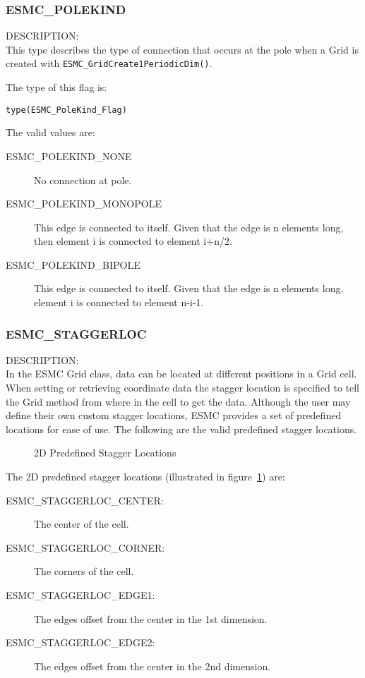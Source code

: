 \subsubsection{ESMC\_POLEKIND}
\label{const:cpolekind}

{\sf DESCRIPTION:\\}
This type describes the type of connection that occurs at the pole when a Grid is 
created with {\tt ESMC\_GridCreate1PeriodicDim()}.

The type of this flag is:

{\tt type(ESMC\_PoleKind\_Flag)}

The valid values are:
\begin{description}
\item [ESMC\_POLEKIND\_NONE] No connection at pole.

\item [ESMC\_POLEKIND\_MONOPOLE] This edge is connected to itself. Given
that the edge is n elements long, then element i is connected to
element i+n/2.

\item [ESMC\_POLEKIND\_BIPOLE] This edge is connected to itself. Given
that the edge is n elements long, element i is connected to element n-i-1.
\end{description}


\subsubsection{ESMC\_STAGGERLOC}
\label{const:cstaggerloc}

 {\sf DESCRIPTION:\\}
 In the ESMC Grid class, data can be located at different positions in a
 Grid cell.  When setting or retrieving coordinate data the stagger location is
 specified to tell the Grid method  from where in the cell to get the data. 
 Although the user may define their own custom stagger locations, 
 ESMC provides a set of predefined locations for ease of use. The
following are the valid predefined stagger locations. 

\medskip

\begin{center}
\begin{figure}
\center
{}
\caption{2D Predefined Stagger Locations}
\label{fig:gridstaggerloc2d}
\end{figure}
\end{center}

The 2D predefined stagger locations (illustrated in figure~\ref{fig:gridstaggerloc2d}) are:\\
\begin{description}
\item [ESMC\_STAGGERLOC\_CENTER:] The center of the cell.
\item [ESMC\_STAGGERLOC\_CORNER:] The corners of the cell.
\item [ESMC\_STAGGERLOC\_EDGE1:] The edges offset from the center in the 1st dimension.
\item [ESMC\_STAGGERLOC\_EDGE2:] The edges offset from the center in the 2nd dimension.
\end{description}

